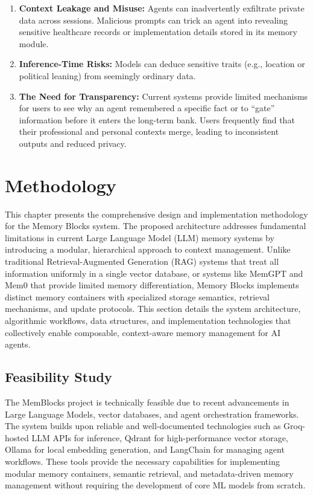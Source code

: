 ﻿\documentclass[12pt,a4paper]{article}
\begin{document}
\begin{enumerate}
    \item \textbf{Context Leakage and Misuse:} Agents can inadvertently exfiltrate private data across sessions. Malicious prompts can trick an agent into revealing sensitive healthcare records or implementation details stored in its memory module.
    
    \item \textbf{Inference-Time Risks:} Models can deduce sensitive traits (e.g., location or political leaning) from seemingly ordinary data.
    
    \item \textbf{The Need for Transparency:} Current systems provide limited mechanisms for users to see why an agent remembered a specific fact or to ``gate'' information before it enters the long-term bank. Users frequently find that their professional and personal contexts merge, leading to inconsistent outputs and reduced privacy.
\end{enumerate}

\section{Methodology}

This chapter presents the comprehensive design and implementation methodology for the Memory Blocks system. The proposed architecture addresses fundamental limitations in current Large Language Model (LLM) memory systems by introducing a modular, hierarchical approach to context management. Unlike traditional Retrieval-Augmented Generation (RAG) systems that treat all information uniformly in a single vector database, or systems like MemGPT and Mem0 that provide limited memory differentiation, Memory Blocks implements distinct memory containers with specialized storage semantics, retrieval mechanisms, and update protocols. This section details the system architecture, algorithmic workflows, data structures, and implementation technologies that collectively enable composable, context-aware memory management for AI agents.

\subsection{Feasibility Study}

The MemBlocks project is technically feasible due to recent advancements in Large Language Models, vector databases, and agent orchestration frameworks. The system builds upon reliable and well-documented technologies such as Groq-hosted LLM APIs for inference, Qdrant for high-performance vector storage, Ollama for local embedding generation, and LangChain for managing agent workflows. These tools provide the necessary capabilities for implementing modular memory containers, semantic retrieval, and metadata-driven memory management without requiring the development of core ML models from scratch.
\end{document}
